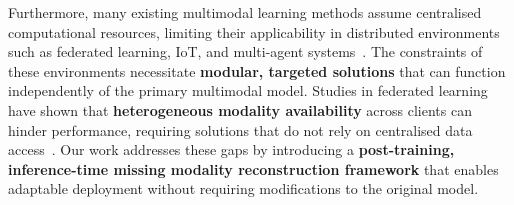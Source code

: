 Furthermore, many existing multimodal learning methods assume centralised computational resources, limiting their applicability in distributed environments such as federated learning, IoT, and multi-agent systems~\cite{NEURIPS2023_9156b0f6,adnan_cfl_2022}. The constraints of these environments necessitate \textbf{modular, targeted solutions} that can function independently of the primary multimodal model. Studies in federated learning have shown that \textbf{heterogeneous modality availability} across clients can hinder performance, requiring solutions that do not rely on centralised data access~\cite{pretrained_multimodal_decision_making_yunhao_24}. Our work addresses these gaps by introducing a \textbf{post-training, inference-time missing modality reconstruction framework} that enables adaptable deployment without requiring modifications to the original model.

